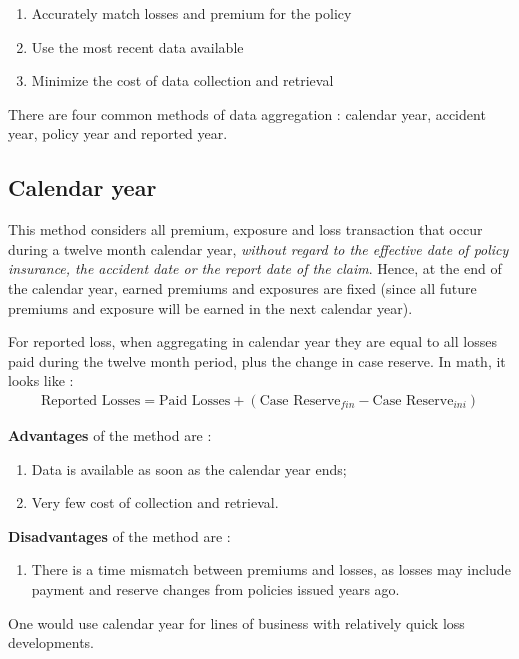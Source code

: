 \documentclass[11pt, english]{memoir}
\numberwithin{definition}{section}
\begin{document}
	\begin{enumerate}
		\item Accurately match losses and premium for the policy
		\item Use the most recent data available
		\item Minimize the cost of data collection and retrieval
	\end{enumerate}

	There are four common methods of data aggregation : calendar year, accident year, policy year and reported year. 

	\subsection{Calendar year}
		This method considers all premium, exposure and loss transaction that occur during a twelve month calendar year, \emph{without regard to the effective date of policy insurance, the accident date or the report date of the claim}. Hence, at the end of the calendar year, earned premiums and exposures are fixed (since all future premiums and exposure will be earned in the next calendar year). 
	
		For reported loss, when aggregating in calendar year they are equal to all losses paid during the twelve month period, plus the change in case reserve. In math, it looks like : 
		\begin{align*}
			\text{Reported Losses} = \text{Paid Losses} + (\text{Case Reserve}_{fin} - \text{Case Reserve}_{ini})
		\end{align*}


		\textbf{Advantages} of the method are :
		\begin{enumerate}
			\item Data is available as soon as the calendar year ends;
			\item Very few cost of collection and retrieval. 
		\end{enumerate}

		\textbf{Disadvantages} of the method are : 
		\begin{enumerate}
			\item There is a time mismatch between premiums and losses, as losses may include payment and reserve changes from policies issued years ago. 
		\end{enumerate}

		One would use calendar year for lines of business with relatively quick loss developments. 
\end{document}
